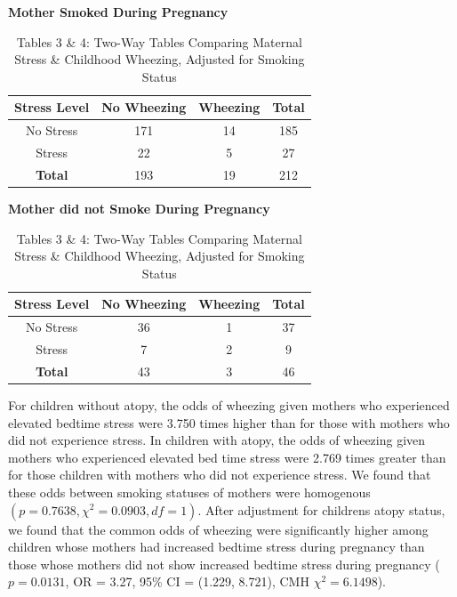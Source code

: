 \documentclass{article}
\begin{document}
	\begin{table}[h]
		\centering
		\captionsetup{labelformat=empty}
		\footnotesize
		\caption{Tables 3 \& 4: Two-Way Tables Comparing Maternal Stress \& Childhood Wheezing, Adjusted for Smoking Status}
		\begin{minipage}{0.48\linewidth}
			\centering
			\textbf{Mother Smoked During Pregnancy} \\[2pt]
			\begin{tabular}{cccc} %
				\toprule
				\textbf{Stress Level} & \textbf{No Wheezing} & \textbf{Wheezing} & \textbf{Total} \\
				\midrule
				No Stress & 171 & 14 & 185 \\
				Stress & 22 & 5 & 27 \\
				\midrule
				\textbf{Total} & 193 & 19 & 212 \\
				\bottomrule
			\end{tabular}
		\end{minipage}
		\hfill
		\begin{minipage}{0.48\linewidth}
			\centering
			\textbf{Mother did not Smoke During Pregnancy} \\[2pt]
			\begin{tabular}{cccc} %
				\toprule
				\textbf{Stress Level} & \textbf{No Wheezing} & \textbf{Wheezing} & \textbf{Total} \\
				\midrule
				No Stress & 36 & 1 & 37 \\
				Stress & 7 & 2 & 9 \\
				\midrule
				\textbf{Total} & 43 & 3 & 46 \\
				\bottomrule
			\end{tabular}
		\end{minipage}
	\end{table}

	For children without atopy, the odds of wheezing given mothers who experienced elevated bedtime stress were 3.750 times higher than for those with mothers who did not experience stress. In children with atopy, the odds of wheezing given mothers who experienced elevated bed time stress were  2.769 times greater than for those children with mothers who did not experience stress. We found that these odds between smoking statuses of mothers were homogenous $(p = 0.7638, \chi^2 = 0.0903, df = 1)$.  After adjustment for childrens atopy status, we found that the common odds of wheezing were significantly higher among children whose mothers had increased bedtime stress during pregnancy than those whose mothers did not show increased bedtime stress during pregnancy ($p=0.0131$, OR = 3.27, 95\% CI = (1.229, 8.721), CMH $\chi^2 = 6.1498$).
\end{document}
